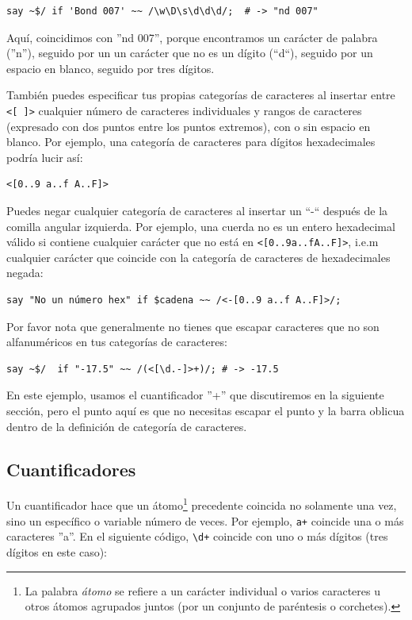 \begin{lstlisting}
say ~$/ if 'Bond 007' ~~ /\w\D\s\d\d\d/;  # -> "nd 007"
\end{lstlisting}
%

Aquí, coincidimos con ''nd 007'', porque encontramos un
carácter de palabra (''n''), seguido por un un carácter que 
no es un dígito (``d``), seguido por un espacio en blanco,
seguido por tres dígitos.

También puedes especificar tus propias categorías de caracteres
al insertar entre \verb|<[ ]>| cualquier número de caracteres
individuales y rangos de caracteres (expresado con dos puntos 
entre los puntos extremos), con o sin espacio en blanco. Por 
ejemplo, una categoría de caracteres para dígitos hexadecimales
podría lucir así:
\begin{lstlisting}
<[0..9 a..f A..F]>
\end{lstlisting}

Puedes negar cualquier categoría de caracteres al insertar un 
``-`` después de la comilla angular izquierda. Por ejemplo,
una cuerda no es un entero hexadecimal válido si contiene
cualquier carácter que no está en \verb'<[0..9a..fA..F]>', i.e.m
cualquier carácter que coincide con la categoría de caracteres
de hexadecimales negada:

\begin{lstlisting}
say "No un número hex" if $cadena ~~ /<-[0..9 a..f A..F]>/;
\end{lstlisting}

Por favor nota que generalmente no tienes que escapar
caracteres que no son alfanuméricos en tus categorías de 
caracteres:

\begin{lstlisting}
say ~$/  if "-17.5" ~~ /(<[\d.-]>+)/; # -> -17.5
\end{lstlisting}

En este ejemplo, usamos el cuantificador ''+'' que discutiremos
en la siguiente sección, pero el punto aquí es que no necesitas
escapar el punto y la barra oblicua dentro de la definición de
categoría de caracteres.

\subsection{Cuantificadores}

Un cuantificador hace que un átomo\footnote{
La palabra \emph{átomo} se refiere a un carácter 
individual o varios caracteres u otros átomos
agrupados juntos (por un conjunto de paréntesis 
o corchetes).} precedente coincida no solamente 
una vez, sino un específico o variable número de
veces. Por ejemplo, \verb|a+| coincide una o más
caracteres ''a''. En el siguiente código, \verb|\d+| 
coincide con uno o más dígitos (tres dígitos en este caso):

